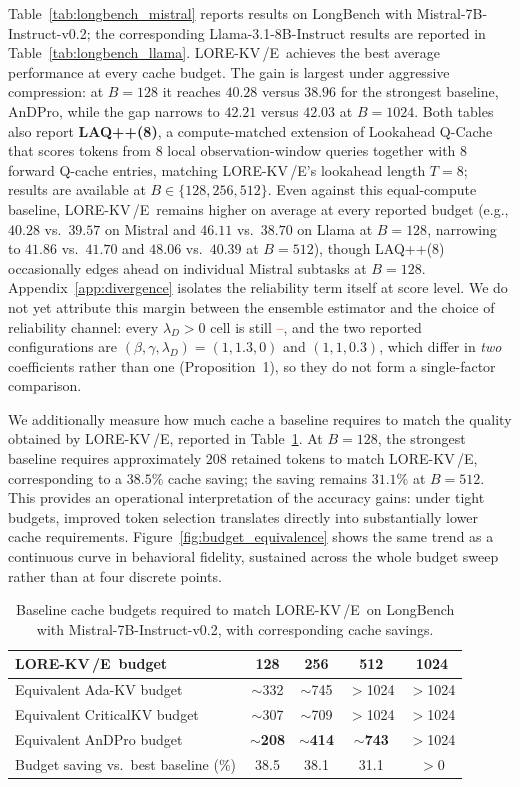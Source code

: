 \documentclass{article} %
\newcommand{\best}[1]{\textcolor{bestblue}{\textbf{#1}}}
\newcommand{\tbd}{\textcolor{red}{--}}
\newcommand{\lorekvE}{LORE-KV\,/E}
\begin{document}
Table~\ref{tab:longbench_mistral} reports results on LongBench with Mistral-7B-Instruct-v0.2; the corresponding Llama-3.1-8B-Instruct results are reported in Table~\ref{tab:longbench_llama}. \lorekvE\ achieves the best average performance at every cache budget. The gain is largest under aggressive compression: at $B=128$ it reaches $40.28$ versus $38.96$ for the strongest baseline, AnDPro, while the gap narrows to $42.21$ versus $42.03$ at $B=1024$. Both tables also report \textbf{LAQ++(8)}, a compute-matched extension of Lookahead Q-Cache \citep{wang2025lookahead} that scores tokens from $8$ local observation-window queries together with $8$ forward Q-cache entries, matching \lorekvE's lookahead length $T{=}8$; results are available at $B\in\{128,256,512\}$. Even against this equal-compute baseline, \lorekvE\ remains higher on average at every reported budget (e.g., $40.28$ vs.\ $39.57$ on Mistral and $46.11$ vs.\ $38.70$ on Llama at $B{=}128$, narrowing to $41.86$ vs.\ $41.70$ and $48.06$ vs.\ $40.39$ at $B{=}512$), though LAQ++(8) occasionally edges ahead on individual Mistral subtasks at $B{=}128$. Appendix~\ref{app:divergence} isolates the reliability term itself at score level. We do not yet attribute this margin between the ensemble estimator and the choice of reliability channel: every $\lambda_D>0$ cell is still \tbd, and the two reported configurations are $(\beta,\gamma,\lambda_D)=(1,1.3,0)$ and $(1,1,0.3)$, which differ in \emph{two} coefficients rather than one (Proposition~1), so they do not form a single-factor comparison.

We additionally measure how much cache a baseline requires to match the quality obtained by \lorekvE, reported in Table~\ref{tab:budget_equivalence}. At $B=128$, the strongest baseline requires approximately $208$ retained tokens to match \lorekvE, corresponding to a $38.5\%$ cache saving; the saving remains $31.1\%$ at $B=512$. This provides an operational interpretation of the accuracy gains: under tight budgets, improved token selection translates directly into substantially lower cache requirements. Figure~\ref{fig:budget_equivalence} shows the same trend as a continuous curve in behavioral fidelity, sustained across the whole budget sweep rather than at four discrete points.

\begin{table}[t]
\caption{Baseline cache budgets required to match \lorekvE\ on LongBench with Mistral-7B-Instruct-v0.2, with corresponding cache savings.}
\label{tab:budget_equivalence}
\centering
\begin{tabular}{lcccc}
\toprule
\lorekvE\ budget & 128 & 256 & 512 & 1024 \\
\midrule
Equivalent Ada-KV budget & $\sim$332 & $\sim$745 & $>$1024 & $>$1024 \\
Equivalent CriticalKV budget & $\sim$307 & $\sim$709 & $>$1024 & $>$1024 \\
Equivalent AnDPro budget & \best{$\sim$208} & \best{$\sim$414} & \best{$\sim$743} & $>$1024 \\
\midrule
Budget saving vs.\ best baseline (\%) & 38.5 & 38.1 & 31.1 & $>0$ \\
\bottomrule
\end{tabular}
\end{table}
\end{document}
